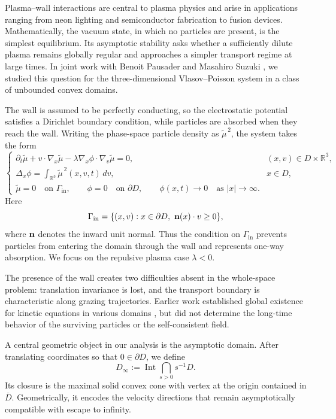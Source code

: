 \documentclass[10pt,reqno]{amsart}
\theoremstyle{definition}
\begin{document}
Plasma--wall interactions are central to plasma physics and arise in applications ranging from neon lighting and semiconductor fabrication to fusion devices. Mathematically, the vacuum state, in which no particles are present, is the simplest equilibrium. Its asymptotic stability asks whether a sufficiently dilute plasma remains globally regular and approaches a simpler transport regime at large times. In joint work with Benoit Pausader and Masahiro Suzuki \cite{HPS24}, we studied this question for the three-dimensional Vlasov--Poisson system in a class of unbounded convex domains.

The wall is assumed to be perfectly conducting, so the electrostatic potential satisfies a Dirichlet boundary condition, while particles are absorbed when they reach the wall. Writing the phase-space particle density as $\widetilde{\mu}^{\,2}$, the system takes the form
\begin{equation}\label{VPW}
\begin{cases}
\partial_t\widetilde{\mu}
+v\cdot\nabla_x\widetilde{\mu}
-\lambda\nabla_x\phi\cdot\nabla_v\widetilde{\mu}=0,
& (x,v)\in D\times\mathbb{R}^3,\\[0.2em]
\displaystyle
\Delta_x\phi=\int_{\mathbb{R}^3}\widetilde{\mu}^{\,2}(x,v,t)\,dv,
& x\in D,\\[0.4em]
\widetilde{\mu}=0 \quad\text{on }\Gamma_{\mathrm{in}},
\qquad
\phi=0 \quad\text{on }\partial D,
\qquad
\phi(x,t)\to0 \quad\text{as }|x|\to\infty .
\end{cases}
\end{equation}
Here
\[
\Gamma_{\mathrm{in}}
=\{(x,v):x\in\partial D,\ {\bf n}(x)\cdot v\geq0\},
\]
where ${\bf n}$ denotes the inward unit normal. Thus the condition on $\Gamma_{\mathrm{in}}$ prevents particles from entering the domain through the wall and represents one-way absorption. We focus on the repulsive plasma case $\lambda<0$.

The presence of the wall creates two difficulties absent in the whole-space problem: translation invariance is lost, and the transport boundary is characteristic along grazing trajectories. Earlier work established global existence for kinetic equations in various domains \cite{G94,G95,HV10,CI23,F18}, but did not determine the long-time behavior of the surviving particles or the self-consistent field.

A central geometric object in our analysis is the asymptotic domain. After translating coordinates so that $0\in\partial D$, we define
\[
D_\infty
:=\operatorname{Int}\bigcap_{s>0}s^{-1}D.
\]
Its closure is the maximal solid convex cone with vertex at the origin contained in $\overline{D}$. Geometrically, it encodes the velocity directions that remain asymptotically compatible with escape to infinity.
\end{document}

